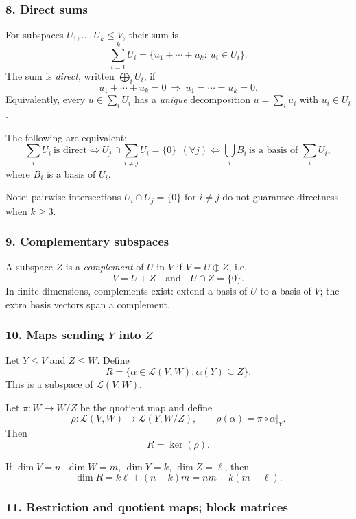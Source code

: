 \documentclass[12pt,a4paper]{article}
\theoremstyle{plain}
\theoremstyle{definition}      %
\begin{document}
\bigskip

\subsubsection*{8. Direct sums}

For subspaces $U_1,\dots,U_k\le V$, their sum is
\[
\sum_{i=1}^k U_i=\{u_1+\cdots+u_k:\ u_i\in U_i\}.
\]
The sum is \emph{direct}, written $\bigoplus_i U_i$, if
\[
u_1+\cdots+u_k=0\ \Rightarrow\ u_1=\cdots=u_k=0.
\]
Equivalently, every $u\in\sum_i U_i$ has a \emph{unique} decomposition $u=\sum_i u_i$ with $u_i\in U_i$.

The following are equivalent:
\[
\sum_i U_i\ \text{is direct}
\iff
U_j\cap\sum_{i\ne j}U_i=\{0\}\ \ (\forall j)
\iff
\bigcup_i B_i\ \text{is a basis of }\sum_i U_i,
\]
where $B_i$ is a basis of $U_i$.

Note: pairwise intersections $U_i\cap U_j=\{0\}$ for $i\ne j$ do not guarantee directness when $k\ge 3$.

\bigskip

\subsubsection*{9. Complementary subspaces}

A subspace $Z$ is a \emph{complement} of $U$ in $V$ if $V=U\oplus Z$, i.e.
\[
V=U+Z\quad\text{and}\quad U\cap Z=\{0\}.
\]
In finite dimensions, complements exist: extend a basis of $U$ to a basis of $V$; the extra basis vectors span a complement.

\bigskip

\subsubsection*{10. Maps sending $Y$ into $Z$}

Let $Y\le V$ and $Z\le W$. Define
\[
R=\{\alpha\in\mathcal L(V,W):\alpha(Y)\subseteq Z\}.
\]
This is a subspace of $\mathcal L(V,W)$.

Let $\pi:W\to W/Z$ be the quotient map and define
\[
\rho:\mathcal L(V,W)\to \mathcal L(Y,W/Z),\qquad \rho(\alpha)=\pi\circ \alpha|_Y.
\]
Then
\[
R=\ker(\rho).
\]

If $\dim V=n$, $\dim W=m$, $\dim Y=k$, $\dim Z=\ell$, then
\[
\dim R = k\ell+(n-k)m = nm-k(m-\ell).
\]

\bigskip

\subsubsection*{11. Restriction and quotient maps; block matrices}
\end{document}
